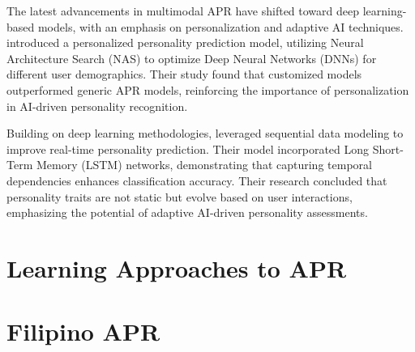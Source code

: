 The latest advancements in multimodal APR have shifted toward deep learning-based models, with an emphasis on personalization and adaptive AI techniques. \citet{Salam2022} introduced a personalized personality prediction model, utilizing Neural Architecture Search (NAS) to optimize Deep Neural Networks (DNNs) for different user demographics. Their study found that customized models outperformed generic APR models, reinforcing the importance of personalization in AI-driven personality recognition.

Building on deep learning methodologies, \citet{Lima2022} leveraged sequential data modeling to improve real-time personality prediction. Their model incorporated Long Short-Term Memory (LSTM) networks, demonstrating that capturing temporal dependencies enhances classification accuracy. Their research concluded that personality traits are not static but evolve based on user interactions, emphasizing the potential of adaptive AI-driven personality assessments.

\section{Learning Approaches to APR}
\label{sec: LearningApproaches}

\section{Filipino APR}
\label{sec: FilipinoAPR}




